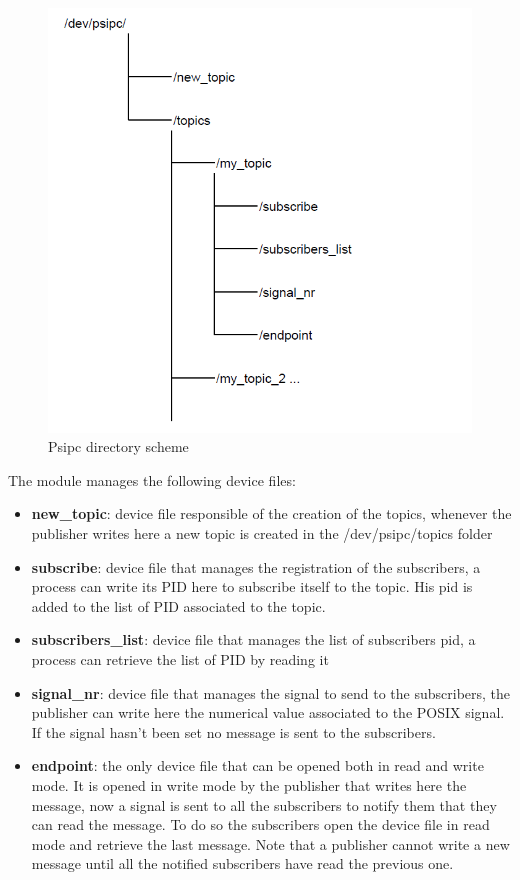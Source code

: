 \documentclass[10pt,a4]{article}
\begin{document}
\begin{center}
  \begin{figure}[H]
      \includegraphics[scale=0.50, center]{assets/psipc_scheme.png}
      \caption{Psipc directory scheme}
      \label{fig: psipc_scheme}
  \end{figure}
\end{center}

The module manages the following device files:
\begin{itemize}
  \item \textbf{new\_topic}: device file responsible of the creation of the topics, whenever the publisher writes here a new topic is created in the /dev/psipc/topics folder
  \item \textbf{subscribe}: device file that manages the registration of the subscribers, a process can write its PID here to subscribe itself to the topic. His pid is added to the list of PID associated to the topic.
  \item \textbf{subscribers\_list}: device file that manages the list of subscribers pid, a process can retrieve the list of PID by reading it
  \item \textbf{signal\_nr}: device file that manages the signal to send to the subscribers, the publisher can write here the numerical value associated to the POSIX signal.
  If the signal hasn't been set no message is sent to the subscribers.
  \item \textbf{endpoint}: the only device file that can be opened both in read and write mode.
  It is opened in write mode by the publisher that writes here the message, now a signal is sent to all the subscribers to notify them that they can read the message.
  To do so the subscribers open the device file in read mode and retrieve the last message.
  Note that a publisher cannot write a new message until all the notified subscribers have read the previous one.

\end{itemize}
\end{document}
